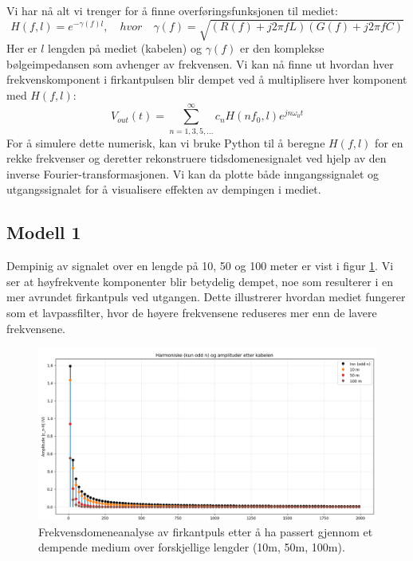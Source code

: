 \noindent Vi har nå alt vi trenger for å finne overføringsfunksjonen til mediet:
\[
    H(f, l) = e^{-\gamma(f) l}, \quad hvor \quad \gamma(f) = \sqrt{(R(f) + j 2\pi f L)(G(f) + j 2\pi f C)}
\]
Her er $l$ lengden på mediet (kabelen) og $\gamma(f)$ er den komplekse bølgeimpedansen som avhenger av frekvensen.
Vi kan nå finne ut hvordan hver frekvenskomponent i firkantpulsen blir dempet ved å multiplisere hver komponent med $H(f, l)$:
\[
    V_{out}(t) = \sum_{n=1,3,5,...}^{\infty} c_n H(n f_0, l) e^{j n \omega_0 t}
\]
For å simulere dette numerisk, kan vi bruke Python til å beregne $H(f, l)$ for en rekke frekvenser og deretter rekonstruere tidsdomenesignalet ved hjelp av den inverse Fourier-transformasjonen.
Vi kan da plotte både inngangssignalet og utgangssignalet for å visualisere effekten av dempingen i mediet.
\subsection{Modell 1}
Dempinig av signalet over en lengde på 10, 50 og 100 meter er vist i figur \ref{fig:modell1}. Vi ser at høyfrekvente komponenter blir betydelig dempet, noe som resulterer i en mer avrundet firkantpuls ved utgangen. Dette illustrerer hvordan mediet fungerer som et lavpassfilter, hvor de høyere frekvensene reduseres mer enn de lavere frekvensene.
\begin{figure}[h]
    \centering
    \includegraphics[width=1\textwidth]{Media/modellering1.png}
    \caption{Frekvensdomeneanalyse av firkantpuls etter å ha passert gjennom et dempende medium over forskjellige lengder (10m, 50m, 100m).}
    \label{fig:modell1}
\end{figure}
\clearpage
